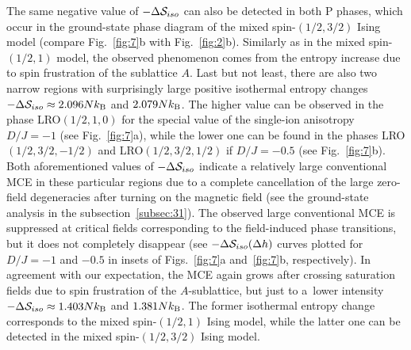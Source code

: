 \documentclass[final,5p,times,sort&compress]{elsarticle}
\begin{document}
The same negative value of $-\Delta {\cal S}_{iso}$ can also be detected in both P phases, which occur in the ground-state phase diagram of the mixed spin-$(1/2,3/2)$ Ising model (compare Fig.~\ref{fig:7}b with Fig.~\ref{fig:2}b). Similarly as in the mixed spin-$(1/2,1)$ model, the observed phenomenon comes from the entropy increase due to spin frustration of the sublattice $A$. Last but not least, there are also two narrow regions with surprisingly large positive isothermal entropy changes $-\Delta {\cal S}_{iso} \approx 2.096Nk_{\rm B}$ and $2.079Nk_{\rm B}$. The higher value can be observed in the phase LRO$(1/2,1,0)$ for the special value of the single-ion anisotropy $D/J=-1$ (see Fig.~\ref{fig:7}a), while the lower one can be found in the phases LRO$(1/2,3/2,-1/2)$ and LRO$(1/2,3/2,1/2)$ if $D/J=-0.5$ (see Fig.~\ref{fig:7}b). Both aforementioned values of $-\Delta {\cal S}_{iso}$ indicate a relatively large conventional MCE in these particular regions due to a complete cancellation of the large zero-field degeneracies after turning on the magnetic field (see the ground-state analysis in the subsection~\ref{subsec:31}). The observed large conventional MCE is suppressed at critical fields corresponding to the field-induced phase transitions, but it does not completely disappear (see $-\Delta{\cal S}_{iso}(\Delta h)$ curves plotted for $D/J=-1$ and $-0.5$ in insets of Figs.~\ref{fig:7}a and~\ref{fig:7}b, respectively). In agreement with our expectation, the MCE again grows after crossing saturation fields due to spin frustration of the $A$-sublattice, but just to a~lower intensity $-\Delta {\cal S}_{iso} \approx 1.403Nk_{\rm B}$ and $1.381Nk_{\rm B}$. The former isothermal entropy change corresponds to the mixed spin-$(1/2,1)$ Ising model, while the latter one can be detected in the mixed spin-$(1/2,3/2)$ Ising model.
\end{document}
